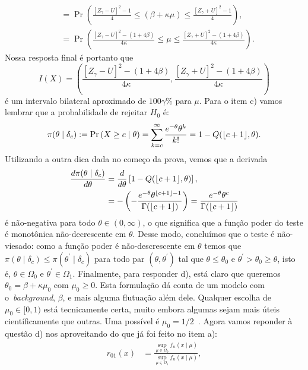 \documentclass[a4paper,10pt, notitlepage]{report}
\newcommand{\pr}{\operatorname{Pr}} %
\DeclarePairedDelimiter\floor{\lfloor}{\rfloor}
\begin{document}
{\begin{align*}
   &= \pr\left(\frac{[Z_{\gamma} - U]^2 -1}{4} \leq (\beta + \kappa\mu) \leq \frac{[Z_{\gamma} + U]^2 - 1}{4}\right),\\
     &=  \pr\left(\frac{[Z_{\gamma} - U]^2 - (1 + 4\beta)}{4\kappa} \leq \mu \leq \frac{[Z_{\gamma} + U]^2 - (1 + 4\beta)}{4\kappa}\right).
\end{align*}
Nossa resposta final é portanto que
\begin{equation*}
 I(X) = \left(\frac{[Z_{\gamma} - U]^2 - (1 + 4\beta)}{4\kappa}, \frac{[Z_{\gamma} + U]^2 - (1 + 4\beta)}{4\kappa}\right)
\end{equation*}
é um intervalo bilateral aproximado de $100\gamma\%$ para $\mu$.
Para o item c) vamos lembrar que a probabilidade de rejeitar $H_0$ é:
\begin{equation*}
\pi(\theta \mid \delta_c) := \pr\left(X \geq c \mid \theta \right) = \sum_{k=c}^\infty \frac{e^{-\theta} \theta^k}{k!} = 1 - Q(\floor*{c + 1}, \theta). 
\end{equation*}
Utilizando a outra dica dada no começo da prova, vemos que  a derivada
\begin{align*}
 \frac{d\pi(\theta \mid \delta_c)}{d\theta} &= \frac{d}{d\theta} \left[1 - Q(\floor*{c + 1}, \theta)\right],\\
 &= -\left(-\frac{e^{-\theta}\theta^{\floor*{c+1}-1}}{\Gamma(\floor*{c + 1})}\right) = \frac{e^{-\theta}\theta^{c}}{\Gamma(\floor*{c + 1})}
\end{align*}
é não-negativa para todo $\theta \in (0, \infty)$, o que significa que a função poder do teste é monotônica não-decrescente em $\theta$.
Desse modo, concluímos que o teste é não-viesado: como a função poder é não-descrescente em $\theta$ temos que $\pi(\theta \mid \delta_c) \leq \pi(\theta^\prime \mid \delta_c)$ para todo par $(\theta, \theta^\prime)$ tal que $\theta \leq \theta_0$ e $\theta^\prime > \theta_0 \geq \theta$, isto é, $\theta \in \Omega_0$ e $\theta^\prime \in \Omega_1$.
Finalmente, para responder d), está claro que queremos $\theta_0 = \beta + \kappa\mu_0$ com $\mu_0 \geq 0$. 
Esta formulação dá conta de um modelo com o~\textit{background}, $\beta$, e mais alguma flutuação além dele.
Qualquer escolha de $\mu_0 \in [0,1)$ está tecnicamente certa, muito embora algumas sejam mais úteis científicamente que outras.
Uma possível é $\mu_0 = 1/2$~\citep{VanDyk2014}.
Agora vamos reponder à questão d) nos aproveitando do que já foi feito no item a):
\begin{align*}
 r_{01}(x) &= \frac{\sup_{\mu \in \Omega_0}f_n(x \mid \mu)}{\sup_{\mu \in \Omega_1}f_n(x \mid \mu)},\\

\end{align*}}
\end{document}
